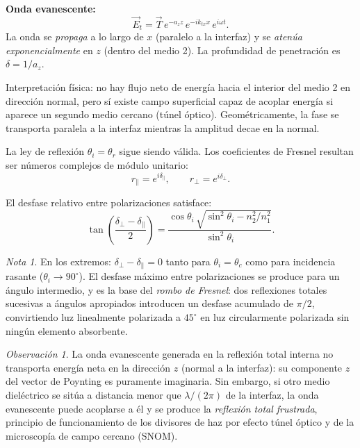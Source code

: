 \documentclass[12pt, a4paper]{article}
\theoremstyle{plain}
\theoremstyle{definition}
\theoremstyle{remark}
\newtheorem*{nota}{Nota}
\newtheorem*{observacion}{Observación}
\newcommand{\ve}[1]{\vec{#1}}
\begin{document}
\begin{mdframed}[style=resultado]
\textbf{Onda evanescente:}
\begin{equation}
  \ve{E}_t = \ve{T}\,e^{-a_z z}\,e^{-ik_{tx} x}\,e^{i\omega t}.
  \label{eq:evanescente}
\end{equation}
La onda se \emph{propaga} a lo largo de $x$ (paralelo a la interfaz) y se
\emph{atenúa exponencialmente} en $z$ (dentro del medio 2). La profundidad de
penetración es $\delta = 1/a_z$.
\end{mdframed}

Interpretación física: no hay flujo neto de energía hacia el interior del medio
2 en dirección normal, pero sí existe campo superficial capaz de acoplar energía
si aparece un segundo medio cercano (túnel óptico). Geométricamente, la fase se
transporta paralela a la interfaz mientras la amplitud decae en la normal.

La ley de reflexión $\theta_i = \theta_r$ sigue siendo válida. Los
coeficientes de Fresnel resultan ser números complejos de módulo unitario:
\[
  r_\parallel = e^{i\delta_\parallel}, \qquad r_\perp = e^{i\delta_\perp}.
\]

El desfase relativo entre polarizaciones satisface:
\begin{equation}
  \tan\!\left(\frac{\delta_\perp - \delta_\parallel}{2}\right)
  = \frac{\cos\theta_i\,\sqrt{\sin^2\theta_i - n_2^2/n_1^2}}{\sin^2\theta_i}.
  \label{eq:desfase_total}
\end{equation}

\begin{nota}
En los extremos: $\delta_\perp - \delta_\parallel = 0$ tanto para
$\theta_i = \theta_c$ como para incidencia rasante ($\theta_i \to 90^{\circ}$).
El desfase máximo entre polarizaciones se produce para un ángulo intermedio,
y es la base del \emph{rombo de Fresnel}: dos reflexiones totales sucesivas
a ángulos apropiados introducen un desfase acumulado de $\pi/2$, convirtiendo
luz linealmente polarizada a $45^{\circ}$ en luz circularmente polarizada sin
ningún elemento absorbente.
\end{nota}

\begin{observacion}
La onda evanescente generada en la reflexión total interna no transporta energía
neta en la dirección $z$ (normal a la interfaz): su componente $z$ del vector de
Poynting es puramente imaginaria. Sin embargo, si otro medio dieléctrico se sitúa
a distancia menor que $\lambda/(2\pi)$ de la interfaz, la onda evanescente puede
acoplarse a él y se produce la \emph{reflexión total frustrada}, principio de
funcionamiento de los divisores de haz por efecto túnel óptico y de la
microscopía de campo cercano (SNOM).
\end{observacion}
\end{document}
